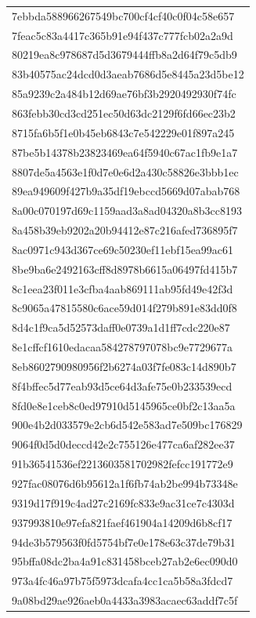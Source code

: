 \begin{tabular}{l}
7ebbda588966267549bc700cf4cf40c0f04c58e657 \\
7feac5c83a4417c365b91e94f437c777fcb02a2a9d \\
80219ea8c978687d5d3679444ffb8a2d64f79c5db9 \\
83b40575ac24dcd0d3aeab7686d5e8445a23d5be12 \\
85a9239c2a484b12d69ae76bf3b2920492930f74fc \\
863febb30cd3cd251ec50d63dc2129f6fd66ec23b2 \\
8715fa6b5f1e0b45eb6843c7e542229e01f897a245 \\
87be5b14378b23823469ea64f5940c67ac1fb9e1a7 \\
8807de5a4563e1f0d7e0e6d2a430c58826e3bbb1ec \\
89ea949609f427b9a35df19ebccd5669d07abab768 \\
8a00c070197d69c1159aad3a8ad04320a8b3cc8193 \\
8a458b39eb9202a20b94412e87c216afed736895f7 \\
8ac0971c943d367ce69c50230ef11ebf15ea99ac61 \\
8be9ba6e2492163cff8d8978b6615a06497fd415b7 \\
8c1eea23f011e3cfba4aab869111ab95fd49e42f3d \\
8c9065a47815580c6ace59d014f279b891e83dd0f8 \\
8d4c1f9ca5d52573daff0e0739a1d1ff7cdc220e87 \\
8e1cffcf1610edacaa584278797078bc9e7729677a \\
8eb8602790980956f2b6274a03f7fe083c14d890b7 \\
8f4bffec5d77eab93d5ce64d3afe75e0b233539ecd \\
8fd0e8e1ceb8c0ed97910d5145965ce0bf2c13aa5a \\
900e4b2d033579e2cb6d542e583ad7e509bc176829 \\
9064f0d5d0deccd42e2c755126e477ca6af282ee37 \\
91b36541536ef2213603581702982fefcc191772e9 \\
927fac08076d6b95612a1f6fb74ab2be994b73348e \\
9319d17f919c4ad27c2169fc833e9ac31ce7c4303d \\
937993810e97efa821faef461904a14209d6b8cf17 \\
94de3b579563f0fd5754bf7e0e178e63c37de79b31 \\
95bffa08dc2ba4a91c831458bceb27ab2e6ec090d0 \\
973a4fc46a97b75f5973dcafa4cc1ca5b58a3fdcd7 \\
9a08bd29ae926aeb0a4433a3983acaec63addf7c5f \\

\end{tabular}
